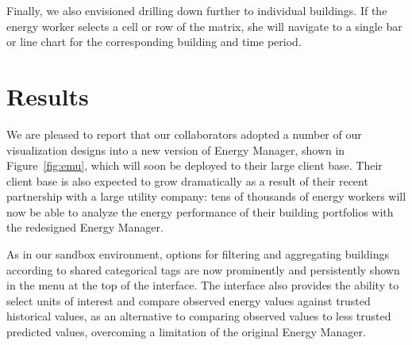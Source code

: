 \documentclass[journal]{vgtc}                %
\newcommand{\tm}[1]{\textcolor{red}{#1}}
\newcommand{\mb}[1]{\textcolor{blue}{#1}}
\newcommand{\jn}[1]{\textcolor{darkGreen}{#1}}
\begin{document}
Finally, we also envisioned drilling down further to individual buildings. 
If the energy worker selects a cell or row of the matrix, she will navigate to a single bar or line chart for the corresponding building and time period.



\section{Results}
\label{results}


We are pleased to report that our collaborators adopted a number of our visualization designs into a new version of Energy Manager, shown in Figure~\ref{fig:emu}, which will soon be deployed to their large client base.
Their client base is also expected to grow dramatically as a result of their recent partnership with a large utility company: tens of thousands of energy workers will now be able to analyze the energy performance of their building portfolios with the redesigned Energy Manager. 

As in our sandbox environment, options for filtering and aggregating buildings according to shared categorical tags are now prominently and persistently shown in the menu at the top of the interface. 
The interface also provides the ability to select units of interest and compare observed energy values against trusted historical values, as an alternative to comparing observed values to less trusted predicted values, overcoming a limitation of the original Energy Manager.
\end{document}
